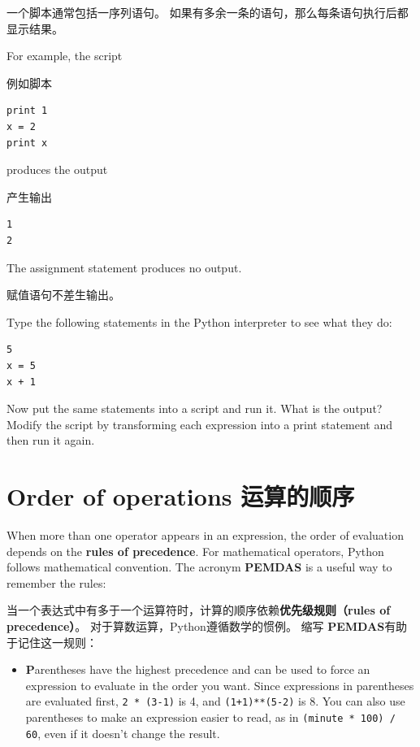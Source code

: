 \documentclass[10pt]{book}
\begin{document}
\begin{CJK}{UTF8}{gbsn}
一个脚本通常包括一序列语句。
如果有多余一条的语句，那么每条语句执行后都显示结果。

For example, the script

例如脚本

\begin{verbatim}
print 1
x = 2
print x
\end{verbatim}
%
produces the output

产生输出

\begin{verbatim}
1
2
\end{verbatim}
%
The assignment statement produces no output.

赋值语句不差生输出。

\begin{exercise}

Type the following statements in the Python interpreter to see
what they do:

\begin{verbatim}
5
x = 5
x + 1
\end{verbatim}
%
Now put the same statements into a script and run it.  What
is the output?  Modify the script by transforming each
expression into a print statement and then run it again.
\end{exercise}


\section{Order of operations 运算的顺序}

When more than one operator appears in an expression, the order of
evaluation depends on the {\bf rules of precedence}.  For
mathematical operators, Python follows mathematical convention.
The acronym {\bf PEMDAS} is a useful way to
remember the rules:

当一个表达式中有多于一个运算符时，计算的顺序依赖{\bf 优先级规则（rules of precedence）}。
对于算数运算，Python遵循数学的惯例。
缩写 {\bf PEMDAS}有助于记住这一规则：

\begin{itemize}

\item {\bf P}arentheses have the highest precedence and can be used 
to force an expression to evaluate in the order you want. Since
expressions in parentheses are evaluated first, {\tt 2 * (3-1)} is 4,
and {\tt (1+1)**(5-2)} is 8. You can also use parentheses to make an
expression easier to read, as in {\tt (minute * 100) / 60}, even
if it doesn't change the result.


\end{itemize}
\end{CJK}
\end{document}
